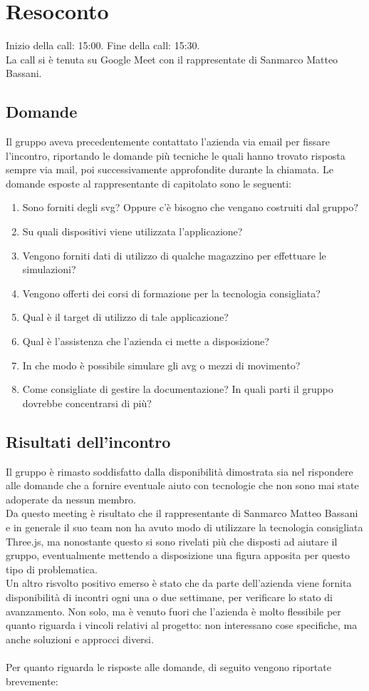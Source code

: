 \section{Resoconto}
Inizio della call: 15:00. Fine della call: 15:30. \\
La call si è tenuta su Google Meet con il rappresentate di Sanmarco Matteo Bassani.
\subsection{Domande}
Il gruppo aveva precedentemente contattato l'azienda via email per fissare l'incontro, riportando le domande più tecniche le quali hanno
trovato risposta sempre via mail, poi successivamente approfondite durante la chiamata.
Le domande esposte al rappresentante di capitolato sono le seguenti:

\begin{enumerate}
    \item Sono forniti degli svg? Oppure c'è bisogno che vengano costruiti dal gruppo?
    \item Su quali dispositivi viene utilizzata l'applicazione?
    \item Vengono forniti dati di utilizzo di qualche magazzino per effettuare le simulazioni?
    \item Vengono offerti dei corsi di formazione per la tecnologia consigliata?
    \item Qual è il target di utilizzo di tale applicazione?
    \item Qual è l'assistenza che l'azienda ci mette a disposizione?
    \item In che modo è possibile simulare gli avg o mezzi di movimento?
    \item Come consigliate di gestire la documentazione? In quali parti il gruppo dovrebbe concentrarsi di più?
\end{enumerate}

\subsection{Risultati dell'incontro}
Il gruppo è rimasto soddisfatto dalla disponibilità dimostrata sia nel
rispondere alle domande che a fornire eventuale aiuto con tecnologie che non sono mai state adoperate da nessun membro.
\\ Da questo meeting è risultato che il rappresentante di Sanmarco Matteo Bassani e in generale il suo team non ha avuto modo di utilizzare la tecnologia consigliata Three.js, ma nonostante questo 
si sono rivelati più che disposti ad aiutare il gruppo, eventualmente mettendo a disposizione una figura apposita per questo tipo di problematica.
\\ Un altro risvolto positivo emerso è stato che da parte dell'azienda viene fornita disponibilità di incontri ogni una o due settimane, per verificare lo stato di avanzamento. Non solo, ma
è venuto fuori che l'azienda è molto flessibile per quanto riguarda i vincoli relativi al progetto: non interessano cose specifiche, ma anche soluzioni e approcci diversi.
\\ \\ Per quanto riguarda le risposte alle domande, di seguito vengono riportate brevemente:

